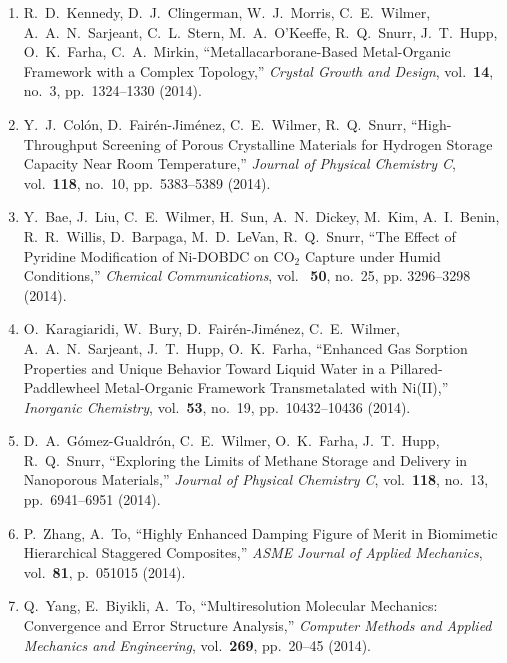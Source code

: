 \begin{enumerate}

\item R.\ D.\ Kennedy, D.\ J.\ Clingerman, W.\ J.\ Morris,
  C.\ E.\ Wilmer, A.\ A.\ N.\ Sarjeant, C.\ L.\ Stern,
  M.\ A.\ O'Keeffe, R.\ Q.\ Snurr, J.\ T.\ Hupp, O.\ K.\ Farha,
  C.\ A.\ Mirkin, ``Metallacarborane-Based Metal-Organic Framework
  with a Complex Topology,'' \textit{Crystal Growth and Design},
  vol.\ \textbf{14}, no.\ 3, pp.\ 1324--1330 (2014).

\item Y.\ J.\ Col\'{o}n, D.\ Fair\'{e}n-Jim\'{e}nez, C.\ E.\ Wilmer,
  R.\ Q.\ Snurr, ``High-Throughput Screening of Porous Crystalline
  Materials for Hydrogen Storage Capacity Near Room Temperature,''
  \textit{Journal of Physical Chemistry C}, vol.\ \textbf{118},
  no.\ 10, pp.\ 5383--5389 (2014).
  
\item Y.\ Bae, J.\ Liu, C.\ E.\ Wilmer, H.\ Sun, A.\ N.\ Dickey,
  M.\ Kim, A.\ I.\ Benin, R.\ R.\ Willis, D.\ Barpaga, M.\ D.\ LeVan,
  R.\ Q.\ Snurr, ``The Effect of Pyridine Modification of Ni-DOBDC on
  $\mathrm{CO}_2$ Capture under Humid Conditions,'' \textit{Chemical
    Communications}, vol. \ \textbf{50}, no.\ 25, pp. 3296--3298
  (2014).
  
\item O.\ Karagiaridi, W.\ Bury, D.\ Fair\'{e}n-Jim\'{e}nez,
  C.\ E.\ Wilmer, A.\ A.\ N.\ Sarjeant, J.\ T.\ Hupp, O.\ K.\ Farha,
  ``Enhanced Gas Sorption Properties and Unique Behavior Toward Liquid
  Water in a Pillared-Paddlewheel Metal-Organic Framework
  Transmetalated with Ni(II),'' \textit{Inorganic Chemistry},
  vol.\ \textbf{53}, no.\ 19, pp.\ 10432--10436 (2014).

\item D.\ A.\ G\'{o}mez-Gualdr\'{o}n, C.\ E.\ Wilmer, O.\ K.\ Farha,
  J.\ T.\ Hupp, R.\ Q.\ Snurr, ``Exploring the Limits of Methane
  Storage and Delivery in Nanoporous Materials,'' \textit{Journal of
    Physical Chemistry C}, vol.\ \textbf{118}, no.\ 13,
  pp.\ 6941--6951 (2014).

\item P.\ Zhang, A.\ To, ``Highly Enhanced Damping Figure of Merit in
  Biomimetic Hierarchical Staggered Composites,'' \textit{ASME Journal
    of Applied Mechanics}, vol.\ \textbf{81}, p.\ 051015 (2014).

\item Q.\ Yang, E.\ Biyikli, A.\ To, ``Multiresolution Molecular
  Mechanics: Convergence and Error Structure Analysis,''
  \textit{Computer Methods and Applied Mechanics and Engineering},
  vol.\ \textbf{269}, pp.\ 20--45 (2014).


\end{enumerate}

